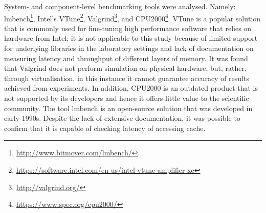 System- and component-level benchmarking tools were analysed. Namely: lmbench\footnote{\url{http://www.bitmover.com/lmbench/}}, Intel's VTune\footnote{\url{https://software.intel.com/en-us/intel-vtune-amplifier-xe}}, Valgrind\footnote{\url{http://valgrind.org/}}, and CPU2000\footnote{\url{https://www.spec.org/cpu2000/}}. VTune is a popular solution that is commonly used for fine-tuning high performance software that relies on hardware from Intel; it is not applicable to this study because of limited support for underlying libraries in the laboratory settings and lack of documentation on measuring latency and throughput of different layers of memory. It was found that Valgrind does not perform simulation on physical hardware, but, rather, through virtualisation, in this instance it cannot guarantee accuracy of results achieved from experiments. In addition, CPU2000 is an outdated product that is not supported by its developers and hence it offers little value to the scientific community. The tool lmbench is an open-source solution that was developed in early 1990s. Despite the lack of extensive documentation, it was possible to confirm that it is capable of checking latency of accessing cache.


